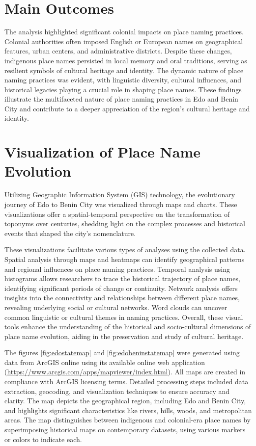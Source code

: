 \section{Main Outcomes}

The analysis highlighted significant colonial impacts on place naming practices. Colonial authorities often imposed English or European names on geographical features, urban centers, and administrative districts. Despite these changes, indigenous place names persisted in local memory and oral traditions, serving as resilient symbols of cultural heritage and identity. The dynamic nature of place naming practices was evident, with linguistic diversity, cultural influences, and historical legacies playing a crucial role in shaping place names. These findings illustrate the multifaceted nature of place naming practices in Edo and Benin City and contribute to a deeper appreciation of the region's cultural heritage and identity.

\section{Visualization of Place Name Evolution}

Utilizing Geographic Information System (GIS) technology, the evolutionary journey of Edo to Benin City was visualized through maps and charts. These visualizations offer a spatial-temporal perspective on the transformation of toponyms over centuries, shedding light on the complex processes and historical events that shaped the city's nomenclature.

These visualizations facilitate various types of analyses using the collected data. Spatial analysis through maps and heatmaps can identify geographical patterns and regional influences on place naming practices. Temporal analysis using histograms allows researchers to trace the historical trajectory of place names, identifying significant periods of change or continuity. Network analysis offers insights into the connectivity and relationships between different place names, revealing underlying social or cultural networks. Word clouds can uncover common linguistic or cultural themes in naming practices. Overall, these visual tools enhance the understanding of the historical and socio-cultural dimensions of place name evolution, aiding in the preservation and study of cultural heritage.

The figures \ref{fig:edostatemap} and \ref{fig:edobeninstatemap} were generated using data from ArcGIS online using its available online web application (\url{https://www.arcgis.com/apps/mapviewer/index.html}). All maps are created in compliance with ArcGIS licensing terms. Detailed processing steps included data extraction, geocoding, and visualization techniques to ensure accuracy and clarity. The map depicts the geographical region, including Edo and Benin City, and highlights significant characteristics like rivers, hills, woods, and metropolitan areas. The map distinguishes between indigenous and colonial-era place names by superimposing historical maps on contemporary datasets, using various markers or colors to indicate each.

